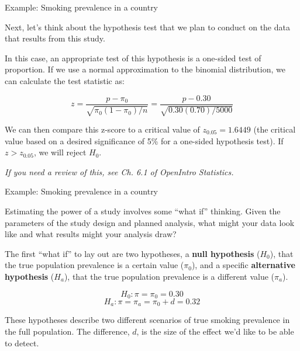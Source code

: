 \documentclass[ignorenonframetext,]{beamer}
\begin{document}
\begin{frame}{Example: Smoking prevalence in a country}

Next, let's think about the hypothesis test that we plan to conduct on
the data that results from this study.

In this case, an appropriate test of this hypothesis is a one-sided test
of proportion. If we use a normal approximation to the binomial
distribution, we can calculate the test statistic as:

\[
z = \frac{p - \pi_0}{\sqrt{\pi_0(1-\pi_0)/n}} = \frac{p - 0.30}{\sqrt{0.30(0.70)/5000}}
\]

We can then compare this z-score to a critical value of
\(z_{0.05} = 1.6449\) (the critical value based on a desired
significance of 5\% for a one-sided hypothesis test). If
\(z > z_{0.05}\), we will reject \(H_0\).

\footnotesize{\textit{If you need a review of this, see Ch. 6.1 of OpenIntro Statistics.}}

\end{frame}

\begin{frame}{Example: Smoking prevalence in a country}

Estimating the power of a study involves some ``what if'' thinking.
Given the parameters of the study design and planned analysis, what
might your data look like and what results might your analysis draw?

The first ``what if'' to lay out are two hypotheses, a \textbf{null
hypothesis} (\(H_0\)), that the true population prevalence is a certain
value (\(\pi_0\)), and a specific \textbf{alternative hypothesis}
(\(H_a\)), that the true population prevalence is a different value
(\(\pi_a\)).

\[ 
H_0 : \pi = \pi_0 = 0.30
\] \[ 
H_a: \pi = \pi_a = \pi_0 + d = 0.32
\]

These hypotheses describe two different scenarios of true smoking
prevalence in the full population. The difference, \(d\), is the size of
the effect we'd like to be able to detect.

\end{frame}
\end{document}
